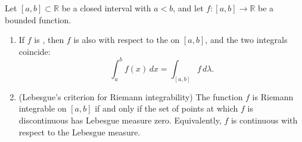\begin{theorem} \label{theorem:riemann_and_lebesgue_integrals_agree_for_riemann_integrable_functions_on_closed_intervals}
Let $[a,b] \subset \mathbb{R}$ be a closed interval with $a < b$, and let $f : [a,b] \to \mathbb{R}$ be a bounded function.

\begin{enumerate}
  \item If $f$ is , then $f$ is also  with respect to the  on $[a,b]$, and the two integrals coincide:
  $$\int_a^b f(x)\,dx = \int_{[a,b]} f\,d\lambda.$$

  \item (Lebesgue's criterion for Riemann integrability) The function $f$ is Riemann integrable on $[a,b]$ if and only if the set of points at which $f$ is discontinuous has Lebesgue measure zero. Equivalently, $f$ is continuous  with respect to the Lebesgue measure.
\end{enumerate}
\end{theorem}

